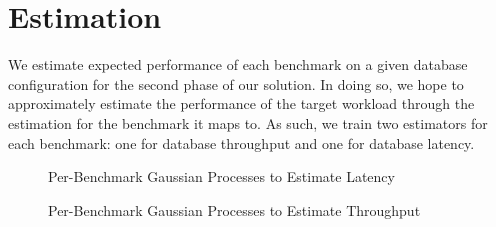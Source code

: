 \section{Estimation} \label{sec:estimation}

We estimate expected performance of each benchmark on a given database
configuration for the second phase of our solution. In doing so, we
hope to approximately estimate the performance of the target workload
through the estimation for the benchmark it maps to. As such, we train
two estimators for each benchmark: one for database throughput and one
for database latency.

\begin{figure}[h]
    \centering
    \caption{Per-Benchmark Gaussian Processes to Estimate Latency}
    \label{fig:gp_r2_latency}
\end{figure}

\begin{figure}[h]
    \centering
    \caption{Per-Benchmark Gaussian Processes to Estimate Throughput}
    \label{fig:gp_r2_throughput}
\end{figure}

